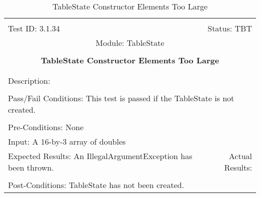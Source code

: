 \documentclass[titlepage]{article}
\begin{document}
\begin{center}%
\begin{table}
\begin{tabular}{|l r|}\hline&\\[-2mm]
	Test ID: 3.1.34	&Status: TBT\\[-3mm]
	\multicolumn{2}{|c|}{Module: TableState}\\&\\
	\multicolumn{2}{|c|}{\textbf{\large{TableState Constructor Elements Too Large}}}\\&\\\hline&\\[-3mm]
	\multicolumn{2}{|p{\textwidth}|}{Description: }\\[1mm]\hline&\\[-3mm]
	\multicolumn{2}{|p{\textwidth}|}{Pass/Fail Conditions: This test is passed if the TableState is not created.}\\[1mm]\hline&\\[-3mm]
	\multicolumn{2}{|p{\textwidth}|}{Pre-Conditions: None}\\[4mm]
	\multicolumn{2}{|p{\textwidth}|}{Input: A 16-by-3 array of doubles}\\[2mm]\hline
	\multicolumn{1}{|p{0.49\textwidth}}{Expected Results: An IllegalArgumentException has been thrown.}	&\multicolumn{1}{|p{0.45\textwidth}|}{Actual Results: }\\\hline&\\[-3mm]
	\multicolumn{2}{|p{\textwidth}|}{Post-Conditions: TableState has not been created.}\\\hline
\end{tabular}
\caption{TableState Constructor Elements Too Large}
\end{table}
\end{center}
\end{document}
